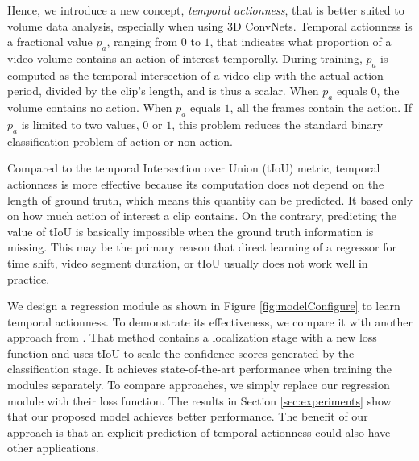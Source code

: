 \documentclass[10pt,twocolumn,letterpaper]{article}
\begin{document}
Hence, we introduce a new concept, \textit{temporal actionness}, that is better suited to volume data analysis, especially when using 3D ConvNets. Temporal actionness is a fractional value $p_{a}$, ranging from $0$ to $1$, that indicates what proportion of a video volume contains an action of interest temporally. During training, $p_{a}$ is computed as the temporal intersection of a video clip with the actual action period, divided by the clip's length, and is thus a scalar. When $p_{a}$ equals $0$, the volume contains no action. When $p_{a}$ equals $1$, all the frames contain the action. If $p_{a}$ is limited to two values, $0$ or $1$, this problem reduces the standard binary classification problem of action or non-action. 

Compared to the temporal Intersection over Union (tIoU) metric, temporal actionness is more effective because its computation does not depend on the length of ground truth, which means this quantity can be predicted. It based only on how much action of interest a clip contains. On the contrary, predicting the value of tIoU is basically impossible when the ground truth information is missing. 
This may be the primary reason that direct learning of a regressor for time shift, video segment duration, or tIoU usually does not work well in practice.

We design a regression module as shown in Figure \ref{fig:modelConfigure} to learn temporal actionness. 
To demonstrate its effectiveness, we compare it with another approach from \cite{scnn_shou_wang_chang_cvpr16}. That method contains a localization stage with a new loss function and uses tIoU to scale the confidence scores generated by the classification stage. It achieves state-of-the-art performance when training the modules separately. To compare approaches, we simply replace our regression module with their loss function. The results in Section \ref{sec:experiments} show that our proposed model achieves better performance. The benefit of our approach is that an explicit prediction of temporal actionness could also have other applications.

\end{document}
